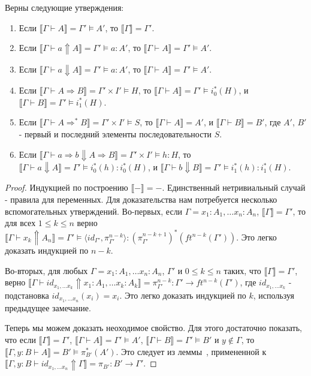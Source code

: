 \documentclass{amsart}
\theoremstyle{definition}
\theoremstyle{remark}
\newcommand{\red}{\Rightarrow}
\renewcommand{\ll}{\llbracket}
\newcommand{\rr}{\rrbracket}
\numberwithin{figure}{section}
\begin{document}
\begin{lem}
Верны следующие утверждения:
\begin{enumerate}
\item Если $\ll \Gamma \vdash A \rr = \Gamma' \models A'$, то $\ll \Gamma \rr = \Gamma'$.
\item Если $\ll \Gamma \vdash a \Uparrow A \rr = \Gamma' \models a : A'$, то $\ll \Gamma \vdash A \rr = \Gamma' \models A'$.
\item Если $\ll \Gamma \vdash a \Downarrow A \rr = \Gamma' \models a : A'$, то $\ll \Gamma \vdash A \rr = \Gamma' \models A'$.
\item Если $\ll \Gamma \vdash A \red B \rr = \Gamma' \times I' \models H$, то $\ll \Gamma \vdash A \rr = \Gamma' \models i_0^*(H)$, и $\ll \Gamma \vdash B \rr = \Gamma' \models i_1^*(H)$.
\item Если $\ll \Gamma \vdash A \red^* B \rr = \Gamma' \times I' \models S$, то $\ll \Gamma \vdash A \rr = A'$, и $\ll \Gamma \vdash B \rr = B'$, где $A'$, $B'$ - первый и последний элементы последовательности $S$.
\item Если $\ll \Gamma \vdash a \red b \Downarrow A \red B \rr = \Gamma' \times I' \models h : H$, то $\ll \Gamma \vdash a \Downarrow A \rr = \Gamma' \models i_0^*(h) : i_0^*(H)$, и $\ll \Gamma \vdash b \Downarrow B \rr = \Gamma' \models i_1^*(h) : i_1^*(H)$.
\end{enumerate}
\end{lem}
\begin{proof}
Индукцией по построению $\ll - \rr = -$.
Единственный нетривиальный случай - правила для переменных.
Для доказательства нам потребуется несколько вспомогательных утверждений.
Во-первых, если $\Gamma = x_1 : A_1, \ldots x_n : A_n$, $\ll \Gamma \rr = \Gamma'$, то для всех $1 \leq k \leq n$ верно $\ll \Gamma \vdash x_k \Uparrow A_n \rr = \Gamma' \models \langle id_{\Gamma'}, \pi^{n-k}_{\Gamma'} \rangle : (\pi^{n-k+1}_{\Gamma'})^*(ft^{n-k}(\Gamma')) $.
Это легко доказать индукцией по $n - k$.

Во-вторых, для любых $\Gamma = x_1 : A_1, \ldots x_n : A_n$, $\Gamma'$ и $0 \leq k \leq n$ таких, что $\ll \Gamma \rr = \Gamma'$, верно $\ll \Gamma \vdash id_{x_1, \ldots x_k} \Uparrow x_1 : A_1, \ldots x_k : A_k \rr = \pi^{n-k}_{\Gamma'} : \Gamma' \to ft^{n-k}(\Gamma')$, где $id_{x_1, \ldots x_k}$ - подстановка $id_{x_1, \ldots x_n}(x_i) = x_i$.
Это легко доказать индукцией по $k$, используя предыдущее замечание.

Теперь мы можем доказать неоходимое свойство.
Для этого достаточно показать, что если $\ll \Gamma \rr = \Gamma'$, $\ll \Gamma \vdash A \rr = \Gamma' \models A'$, $\ll \Gamma \vdash B \rr = \Gamma' \models B'$ и $y \notin \Gamma$, то $\ll \Gamma, y : B \vdash A \rr = B' \models \pi_{B'}^*(A')$.
Это следует из леммы~, примененной к $\ll \Gamma, y : B \vdash id_{x_1, \ldots x_n} \Uparrow \Gamma \rr = \pi_{B'} : B' \to \Gamma'$.
\end{proof}
\end{document}
